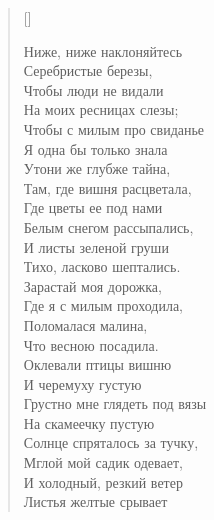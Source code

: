 \settowidth{\versewidth}{Чтобы с милым на свиданье}
\begin{verse}[\versewidth]
\begin{altverse}
Ниже, ниже наклоняйтесь\\
Серебристые березы,\\
Чтобы люди не видали\\
На моих ресницах слезы;\\
Чтобы с милым про свиданье\\
Я одна бы только знала\ldotst\\
Утони же глубже тайна,\\
Там, где вишня расцветала,\\
Где цветы ее под нами\\
Белым снегом рассыпались,\\
И листы зеленой груши\\
Тихо, ласково шептались.\\
Зарастай моя дорожка,\\
Где я с милым проходила,\\
Поломалася малина,\\
Что весною посадила.\\
Оклевали птицы вишню\\
И черемуху густую\ldotst\\
Грустно мне глядеть под вязы\\
На скамеечку пустую\ldotse\\
Солнце спряталось за тучку,\\
Мглой мой садик одевает,\\
И холодный, резкий ветер\\
Листья желтые срывает\ldotst\\
\end{altverse}
\end{verse}


\newpage
\vspace*{0cm}


